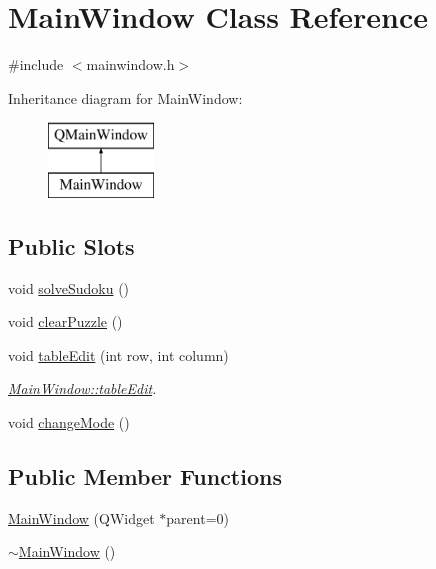 \hypertarget{class_main_window}{}\section{Main\+Window Class Reference}
\label{class_main_window}


{\ttfamily \#include $<$mainwindow.\+h$>$}

Inheritance diagram for Main\+Window\+:\begin{figure}[H]
\begin{center}
\leavevmode
\includegraphics[height=2.000000cm]{class_main_window}
\end{center}
\end{figure}
\subsection*{Public Slots}
\begin{DoxyCompactItemize}
\item 
void \hyperlink{class_main_window_ad2301c8cd784e274020466cc90eda506}{solve\+Sudoku} ()
\item 
void \hyperlink{class_main_window_a7af642fed527fef0c6ab90a1533f5309}{clear\+Puzzle} ()
\item 
void \hyperlink{class_main_window_a90da512747ed1317b4553a04f054074a}{table\+Edit} (int row, int column)
\begin{DoxyCompactList}\small\item\em \hyperlink{class_main_window_a90da512747ed1317b4553a04f054074a}{Main\+Window\+::table\+Edit}. \end{DoxyCompactList}\item 
void \hyperlink{class_main_window_a9aa060076be05d3c231cd4df0fc74932}{change\+Mode} ()
\end{DoxyCompactItemize}
\subsection*{Public Member Functions}
\begin{DoxyCompactItemize}
\item 
\hyperlink{class_main_window_a8b244be8b7b7db1b08de2a2acb9409db}{Main\+Window} (Q\+Widget $\ast$parent=0)
\item 
\hyperlink{class_main_window_ae98d00a93bc118200eeef9f9bba1dba7}{$\sim$\+Main\+Window} ()
\end{DoxyCompactItemize}
